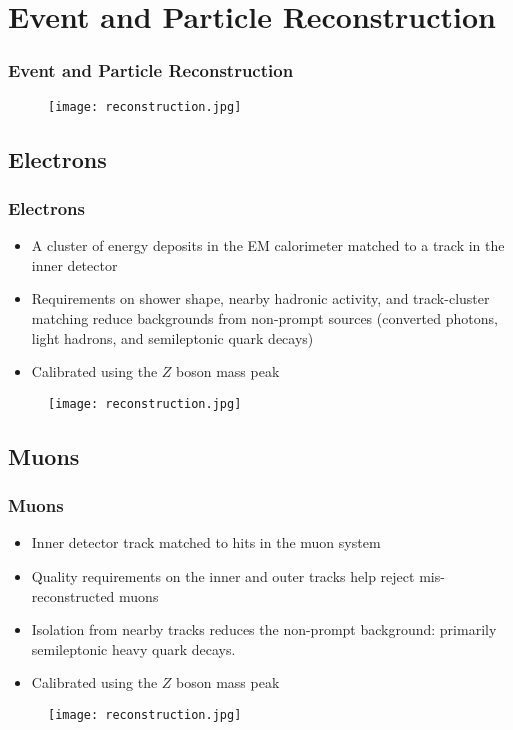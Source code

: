 \section{Event and Particle Reconstruction}

\begin{frame}
    \centering
    \frametitle{Event and Particle Reconstruction}
\begin{figure}
\texttt{[image: reconstruction.jpg]}
\end{figure}

\end{frame}

\subsection{Electrons}

\begin{frame}
    \frametitle{Electrons}
\begin{itemize}
    \item A cluster of energy deposits in the EM calorimeter matched
        to a track in the inner detector
    \item Requirements on shower shape, nearby hadronic activity, and
        track-cluster matching reduce backgrounds from non-prompt
        sources (converted photons, light hadrons, and semileptonic
        quark decays)
    \item Calibrated using the $Z$ boson mass peak
\end{itemize}
\vfill
\begin{figure}
\centering
\texttt{[image: reconstruction.jpg]}
\end{figure}
\end{frame}

\subsection{Muons}

\begin{frame}
    \frametitle{Muons}
\begin{itemize}
    \item Inner detector track matched to hits in the muon system
    \item Quality requirements on the inner and outer tracks help
        reject mis-reconstructed muons
    \item Isolation from nearby tracks reduces the non-prompt
        background: primarily semileptonic heavy quark decays.
    \item Calibrated using the $Z$ boson mass peak
\end{itemize}
\vfill
\begin{figure}
\centering
\texttt{[image: reconstruction.jpg]}
\end{figure}
\end{frame}

